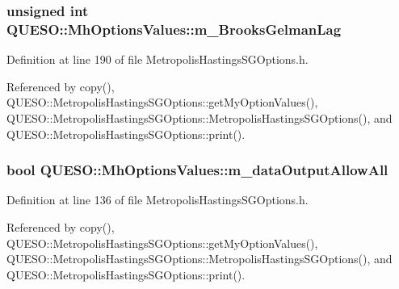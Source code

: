 \hypertarget{class_q_u_e_s_o_1_1_mh_options_values_a574f8a1d72eb5d45af5ab0c020a69447}{
\subsubsection[{m\-\_\-\-Brooks\-Gelman\-Lag}]{\setlength{\rightskip}{0pt plus 5cm}unsigned int Q\-U\-E\-S\-O\-::\-Mh\-Options\-Values\-::m\-\_\-\-Brooks\-Gelman\-Lag}}\label{class_q_u_e_s_o_1_1_mh_options_values_a574f8a1d72eb5d45af5ab0c020a69447}


Definition at line 190 of file Metropolis\-Hastings\-S\-G\-Options.\-h.



Referenced by copy(), Q\-U\-E\-S\-O\-::\-Metropolis\-Hastings\-S\-G\-Options\-::get\-My\-Option\-Values(), Q\-U\-E\-S\-O\-::\-Metropolis\-Hastings\-S\-G\-Options\-::\-Metropolis\-Hastings\-S\-G\-Options(), and Q\-U\-E\-S\-O\-::\-Metropolis\-Hastings\-S\-G\-Options\-::print().

\hypertarget{class_q_u_e_s_o_1_1_mh_options_values_a618cab38b10aab9a1c868a2d8672f374}{
\subsubsection[{m\-\_\-data\-Output\-Allow\-All}]{\setlength{\rightskip}{0pt plus 5cm}bool Q\-U\-E\-S\-O\-::\-Mh\-Options\-Values\-::m\-\_\-data\-Output\-Allow\-All}}\label{class_q_u_e_s_o_1_1_mh_options_values_a618cab38b10aab9a1c868a2d8672f374}


Definition at line 136 of file Metropolis\-Hastings\-S\-G\-Options.\-h.



Referenced by copy(), Q\-U\-E\-S\-O\-::\-Metropolis\-Hastings\-S\-G\-Options\-::get\-My\-Option\-Values(), Q\-U\-E\-S\-O\-::\-Metropolis\-Hastings\-S\-G\-Options\-::\-Metropolis\-Hastings\-S\-G\-Options(), and Q\-U\-E\-S\-O\-::\-Metropolis\-Hastings\-S\-G\-Options\-::print().

